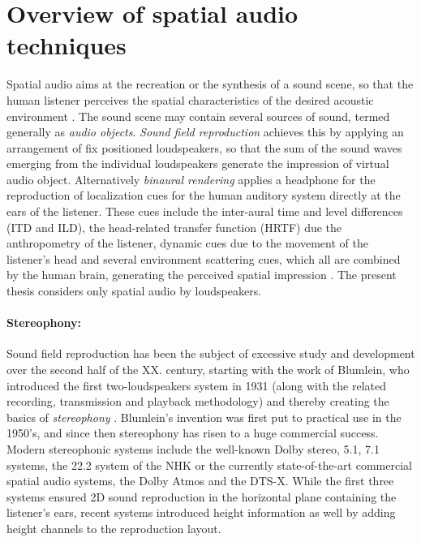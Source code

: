 \section{Overview of spatial audio techniques}
Spatial audio aims at the recreation or the synthesis of a sound scene, so that the human listener perceives the spatial characteristics of the desired acoustic environment \cite{Zhang2017}.
The sound scene may contain several sources of sound, termed generally as \emph{audio objects}.
\emph{Sound field reproduction} achieves this by applying an arrangement of fix positioned loudspeakers, so that the sum of the sound waves emerging from the individual loudspeakers generate the impression of virtual audio object.
Alternatively \emph{binaural rendering} applies a headphone for the reproduction of localization cues for the human auditory system directly at the ears of the listener.
These cues include the inter-aural time and level differences (ITD and ILD), the head-related transfer function (HRTF) due the anthropometry of the listener, dynamic cues due to the movement of the listener's head and several environment scattering cues, which all are combined by the human brain, generating the perceived spatial impression \cite{Blauert1983}.
The present thesis considers only spatial audio by loudspeakers.

\paragraph{Stereophony:}
Sound field reproduction has been the subject of excessive study and development over the second half of the XX. century, starting with the work of Blumlein, who introduced the first two-loudspeakers system in 1931 (along with the related recording, transmission and playback methodology) and thereby creating the basics of \emph{stereophony} \cite{Blumlein1932, Alexander2000}.
Blumlein's invention was first put to practical use in the 1950's, and since then stereophony has risen to a huge commercial success.
Modern stereophonic systems include the well-known Dolby stereo, 5.1, 7.1 systems, the 22.2 system of the NHK \cite{hamasaki2005the, hamasaki2011the} or the currently state-of-the-art commercial spatial audio systems, the Dolby Atmos \cite{Atmos} and the DTS-X.
While the first three systems ensured 2D sound reproduction in the horizontal plane containing the listener's ears, recent systems introduced height information as well by adding height channels to the  reproduction layout.
%

